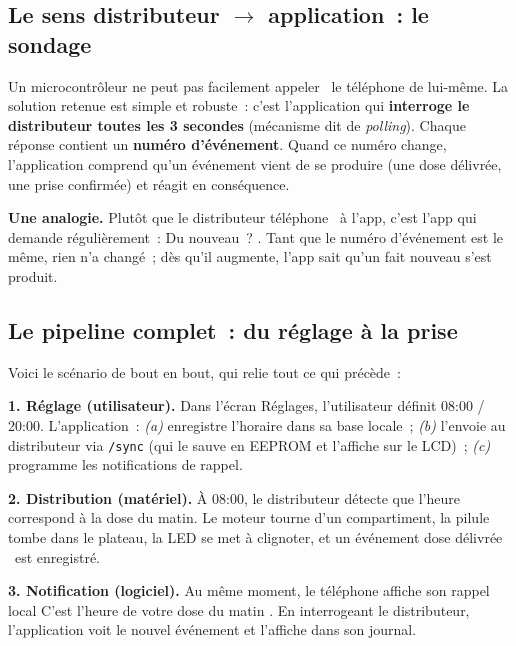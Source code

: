 \documentclass[11pt,a4paper]{report}
\begin{document}
\subsection{Le sens distributeur $\rightarrow$ application~: le \og sondage \fg}

Un microcontr\^oleur ne peut pas facilement \og appeler \fg\ le t\'el\'ephone de
lui-m\^eme. La solution retenue est simple et robuste~: c'est l'application qui
\textbf{interroge le distributeur toutes les 3 secondes} (m\'ecanisme dit de \emph{polling}).
Chaque r\'eponse contient un \textbf{num\'ero d'\'ev\'enement}. Quand ce num\'ero change,
l'application comprend qu'un \'ev\'enement vient de se produire (une dose d\'elivr\'ee, une
prise confirm\'ee) et r\'eagit en cons\'equence.

\begin{infobox}
\textbf{Une analogie.} Plut\^ot que le distributeur \og t\'el\'ephone \fg\ \`a l'app,
c'est l'app qui demande r\'eguli\`erement~: \og Du nouveau~? \fg. Tant que le num\'ero
d'\'ev\'enement est le m\^eme, rien n'a chang\'e~; d\`es qu'il augmente, l'app sait qu'un
fait nouveau s'est produit.
\end{infobox}

\subsection{Le pipeline complet~: du r\'eglage \`a la prise}

Voici le sc\'enario de bout en bout, qui relie tout ce qui pr\'ec\`ede~:

\begin{stepbox}
\textbf{1. R\'eglage (utilisateur).} Dans l'\'ecran R\'eglages, l'utilisateur d\'efinit
08:00 / 20:00. L'application~: \emph{(a)} enregistre l'horaire dans sa base locale~;
\emph{(b)} l'envoie au distributeur via \texttt{/sync} (qui le sauve en EEPROM et l'affiche
sur le LCD)~; \emph{(c)} programme les notifications de rappel.
\end{stepbox}

\begin{stepbox}
\textbf{2. Distribution (mat\'eriel).} \`A 08:00, le distributeur d\'etecte que l'heure
correspond \`a la dose du matin. Le moteur tourne d'un compartiment, la pilule tombe dans le
plateau, la LED se met \`a clignoter, et un \'ev\'enement \og dose d\'elivr\'ee \fg\ est
enregistr\'e.
\end{stepbox}

\begin{stepbox}
\textbf{3. Notification (logiciel).} Au m\^eme moment, le t\'el\'ephone affiche son rappel
local \og C'est l'heure de votre dose du matin \fg. En interrogeant le distributeur,
l'application voit le nouvel \'ev\'enement et l'affiche dans son journal.
\end{stepbox}
\end{document}
